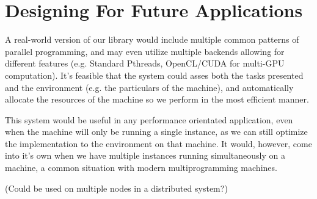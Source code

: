 \section{Designing For Future Applications}

A real-world version of our library would include multiple common patterns of parallel programming, and may even utilize multiple backends allowing for different features (e.g. Standard Pthreads, OpenCL/CUDA for multi-GPU computation). It's feasible that the system could asses both the tasks presented and the environment (e.g. the particulars of the machine), and automatically allocate the resources of the machine so we perform in the most efficient manner.

This system would be useful in any performance orientated application, even when the machine will only be running a single instance, as we can still optimize the implementation to the environment on that machine. It would, however, come into it's own when we have multiple instances running simultaneously on a machine, a common situation with modern multiprogramming machines.

(Could be used on multiple nodes in a distributed system?)